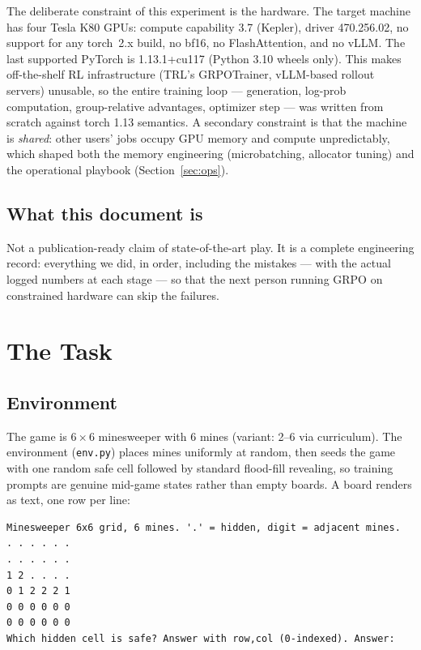 \documentclass[11pt]{article}
\begin{document}
The deliberate constraint of this experiment is the hardware. The target
machine has four Tesla K80 GPUs: compute capability 3.7 (Kepler), driver
470.256.02, no support for any torch~2.x build, no bf16, no FlashAttention,
and no vLLM. The last supported PyTorch is 1.13.1+cu117 (Python 3.10 wheels
only). This makes off-the-shelf RL infrastructure (TRL's GRPOTrainer,
vLLM-based rollout servers) unusable, so the entire training loop ---
generation, log-prob computation, group-relative advantages, optimizer step ---
was written from scratch against torch 1.13 semantics. A secondary constraint
is that the machine is \emph{shared}: other users' jobs occupy GPU memory and
compute unpredictably, which shaped both the memory engineering (microbatching,
allocator tuning) and the operational playbook (Section~\ref{sec:ops}).

\subsection{What this document is}
Not a publication-ready claim of state-of-the-art play. It is a complete
engineering record: everything we did, in order, including the mistakes ---
with the actual logged numbers at each stage --- so that the next person
running GRPO on constrained hardware can skip the failures.

\section{The Task}

\subsection{Environment}
The game is $6\times6$ minesweeper with 6 mines (variant: 2--6 via
curriculum). The environment (\texttt{env.py}) places mines uniformly at
random, then seeds the game with one random safe cell followed by standard
flood-fill revealing, so training prompts are genuine mid-game states rather
than empty boards. A board renders as text, one row per line:

\begin{lstlisting}[language={}, caption={A rendered mid-game state as the policy sees it.}]
Minesweeper 6x6 grid, 6 mines. '.' = hidden, digit = adjacent mines.
. . . . . .
. . . . . .
1 2 . . . .
0 1 2 2 2 1
0 0 0 0 0 0
0 0 0 0 0 0
Which hidden cell is safe? Answer with row,col (0-indexed). Answer:
\end{lstlisting}
\end{document}
